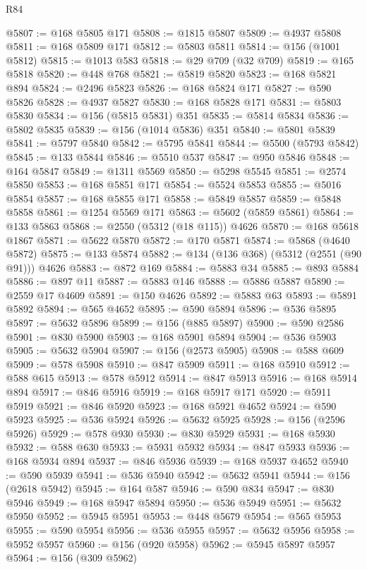 \begin{lexlean}{R84}
\begin{coremodule}
@5807 := @168 @5805 @171
@5808 := @1815 @5807
@5809 := @4937 @5808
@5811 := @168 @5809 @171
@5812 := @5803 @5811
@5814 := @156 (@1001 @5812)
@5815 := @1013 @583
@5818 := @29 @709 (@32 @709)
@5819 := @165 @5818
@5820 := @448 @768
@5821 := @5819 @5820
@5823 := @168 @5821 @894
@5824 := @2496 @5823
@5826 := @168 @5824 @171
@5827 := @590 @5826
@5828 := @4937 @5827
@5830 := @168 @5828 @171
@5831 := @5803 @5830
@5834 := @156 (@5815 @5831) @351
@5835 := @5814 @5834
@5836 := @5802 @5835
@5839 := @156 (@1014 @5836) @351
@5840 := @5801 @5839
@5841 := @5797 @5840
@5842 := @5795 @5841
@5844 := @5500 (@5793 @5842)
@5845 := @133 @5844
@5846 := @5510 @537
@5847 := @950 @5846
@5848 := @164 @5847
@5849 := @1311 @5569
@5850 := @5298 @5545
@5851 := @2574 @5850
@5853 := @168 @5851 @171
@5854 := @5524 @5853
@5855 := @5016 @5854
@5857 := @168 @5855 @171
@5858 := @5849 @5857
@5859 := @5848 @5858
@5861 := @1254 @5569 @171
@5863 := @5602 (@5859 @5861)
@5864 := @133 @5863
@5868 := @2550 (@5312 (@18 @115)) @4626
@5870 := @168 @5618 @1867
@5871 := @5622 @5870
@5872 := @170 @5871
@5874 := @5868 (@4640 @5872)
@5875 := @133 @5874
@5882 := @134 (@136 @368) (@5312 (@2551 (@90 @91))) @4626
@5883 := @872 @169
@5884 := @5883 @34
@5885 := @893 @5884
@5886 := @897 @11
@5887 := @5883 @146
@5888 := @5886 @5887
@5890 := @2559 @17 @4609
@5891 := @150 @4626
@5892 := @5883 @63
@5893 := @5891 @5892
@5894 := @565 @4652
@5895 := @590 @5894
@5896 := @536 @5895
@5897 := @5632 @5896
@5899 := @156 (@885 @5897)
@5900 := @590 @2586
@5901 := @830 @5900
@5903 := @168 @5901 @5894
@5904 := @536 @5903
@5905 := @5632 @5904
@5907 := @156 (@2573 @5905)
@5908 := @588 @609
@5909 := @578 @5908
@5910 := @847 @5909
@5911 := @168 @5910
@5912 := @588 @615
@5913 := @578 @5912
@5914 := @847 @5913
@5916 := @168 @5914 @894
@5917 := @846 @5916
@5919 := @168 @5917 @171
@5920 := @5911 @5919
@5921 := @846 @5920
@5923 := @168 @5921 @4652
@5924 := @590 @5923
@5925 := @536 @5924
@5926 := @5632 @5925
@5928 := @156 (@2596 @5926)
@5929 := @578 @930
@5930 := @830 @5929
@5931 := @168 @5930
@5932 := @588 @630
@5933 := @5931 @5932
@5934 := @847 @5933
@5936 := @168 @5934 @894
@5937 := @846 @5936
@5939 := @168 @5937 @4652
@5940 := @590 @5939
@5941 := @536 @5940
@5942 := @5632 @5941
@5944 := @156 (@2618 @5942)
@5945 := @164 @587
@5946 := @590 @834
@5947 := @830 @5946
@5949 := @168 @5947 @5894
@5950 := @536 @5949
@5951 := @5632 @5950
@5952 := @5945 @5951
@5953 := @448 @5679
@5954 := @565 @5953
@5955 := @590 @5954
@5956 := @536 @5955
@5957 := @5632 @5956
@5958 := @5952 @5957
@5960 := @156 (@920 @5958)
@5962 := @5945 @5897 @5957
@5964 := @156 (@309 @5962)

\end{coremodule}
\end{lexlean}
